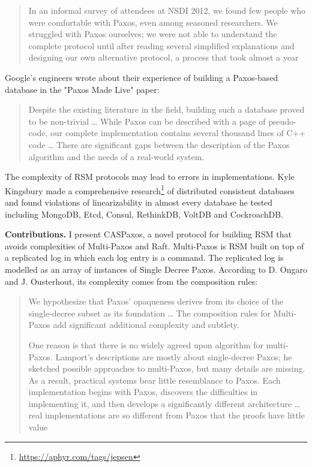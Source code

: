 \documentclass[12pt]{article}
\begin{document}
\begin{quote}
In an informal survey of attendees at NSDI 2012, we found few people who were comfortable with Paxos, even among seasoned researchers. We struggled with Paxos ourselves; we were not able to understand the complete protocol until after reading several simplified explanations and designing our own alternative protocol, a process that took almost a year
\end{quote}

Google's engineers wrote about their experience of building a Paxos-based database in the "Paxos Made Live"\cite{chubby} paper:

\begin{quote}
Despite the existing literature in the field, building such a database proved to be non-trivial \ldots{} While Paxos can be described with a page of pseudo-code, our complete implementation contains several thousand lines of C++ code \ldots{} There are significant gaps between the description of the Paxos algorithm and the needs of a real-world system.
\end{quote}

The complexity of RSM protocols may lead to errors in implementations. Kyle Kingsbury made a comprehensive research\footnote{\href{https://aphyr.com/tags/jepsen}{https://aphyr.com/tags/jepsen}} of distributed consistent databases and found violations of linearizability in almost every database he tested including MongoDB, Etcd, Consul, RethinkDB, VoltDB and CockroachDB.

{\bf Contributions.} I present CASPaxos, a novel protocol for building RSM that avoids complexities of Multi-Paxos and Raft. Multi-Paxos is RSM built on top of a replicated log in which each log entry is a command. The replicated log is modelled as an array of instances of Single Decree Paxos. According to D. Ongaro and J. Ousterhout, its complexity comes from the composition rules:

\begin{quote}
We hypothesize that Paxos’ opaqueness derives from its choice of the single-decree subset as its foundation \ldots{} The composition rules for Multi-Paxos add significant additional complexity and subtlety.

One reason is that there is no widely agreed upon algorithm for multi-Paxos. Lamport’s descriptions are mostly about single-decree Paxos; he sketched possible approaches to multi-Paxos, but many details are missing. As a result, practical systems bear little resemblance to Paxos. Each implementation begins with Paxos, discovers the difficulties in implementing it, and then develops a significantly different architecture \ldots{} real implementations are so different from Paxos that the proofs have little value
\end{quote}
\end{document}

